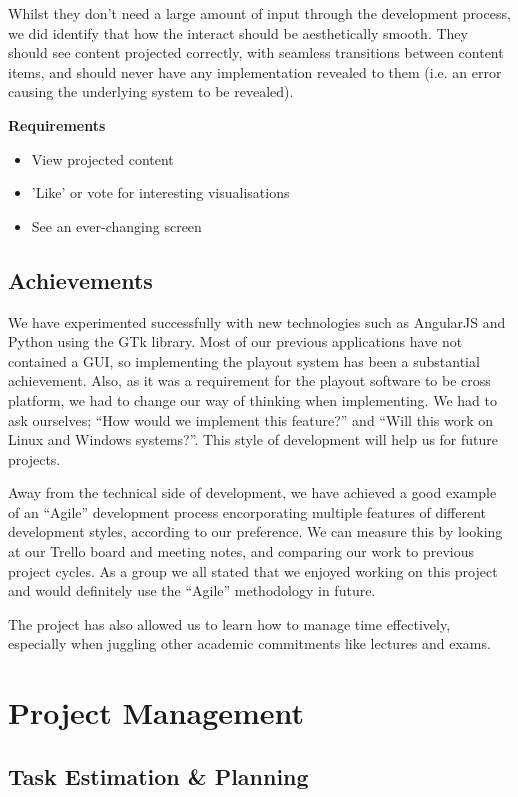 \documentclass[a4paper, titlepage]{article}
\begin{document}
Whilst they don't need a large amount of input through the development process, we did identify that how the interact should be aesthetically smooth. They should see content projected correctly, with seamless transitions between content items, and should never have any implementation revealed to them (i.e. an error causing the underlying system to be revealed).

\textbf{Requirements}
\begin{itemize}
\item View projected content
\item 'Like' or vote for interesting visualisations
\item See an ever-changing screen
\end{itemize}


\subsection{Achievements}
We have experimented successfully with new technologies such as AngularJS and Python using the GTk 
library. Most of our previous applications have not contained a GUI, so implementing the playout
system has been a substantial achievement. Also, as it was a requirement for the playout software 
to be cross platform, we had to change our way of thinking when implementing. We had to ask ourselves;
``How would we implement this feature?'' and ``Will this work on Linux and Windows systems?''. This style
of development will help us for future projects.

Away from the technical side of development, we have achieved a good example of an ``Agile'' development
process encorporating multiple features of different development styles, according to our preference. 
We can measure this by looking at our Trello board and meeting notes, and comparing our work to 
previous project cycles. As a group we all stated that we enjoyed working on this project and would 
definitely use the ``Agile'' methodology in future. 

The project has also allowed us to learn how to manage time effectively, especially when juggling 
other academic commitments like lectures and exams. 


\newpage
\section{Project Management}

\subsection{Task Estimation \& Planning}
\end{document}
